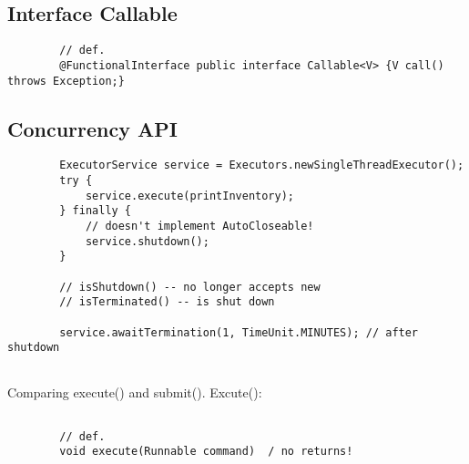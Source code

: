 \documentclass{scrartcl}
\begin{document}
\subsection{Interface Callable}

    \begin{lstlisting}
        // def.
        @FunctionalInterface public interface Callable<V> {V call() throws Exception;}
    \end{lstlisting}

\subsection{Concurrency API}

    \begin{lstlisting}
        ExecutorService service = Executors.newSingleThreadExecutor();
        try {
            service.execute(printInventory);
        } finally {
            // doesn't implement AutoCloseable!
            service.shutdown();
        }

        // isShutdown() -- no longer accepts new
        // isTerminated() -- is shut down

        service.awaitTermination(1, TimeUnit.MINUTES); // after shutdown


    \end{lstlisting}

    Comparing execute() and submit(). Excute():

    \begin{lstlisting}

        // def.
        void execute(Runnable command)	/ no returns!

    \end{lstlisting}
\end{document}
